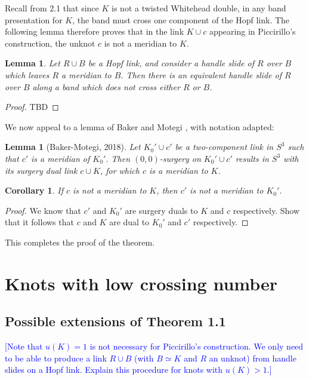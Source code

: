 \documentclass[11pt,usenames,dvipsnames,reqno]{amsart}
\numberwithin{theorem}{section}
\newtheorem{corollary}[theorem]{Corollary}
\newtheorem{lemma}[theorem]{Lemma}
\theoremstyle{ex}
\theoremstyle{rem}
\def\kh#1{\textcolor{Blue}{#1}}
\begin{document}
Recall from 2.1 that since $K$ is not a twisted Whitehead double, in any band presentation for $K$, the band must cross one component of the Hopf link. The following lemma therefore proves that in the link $K\cup c$ appearing in Piccirillo's construction, the unknot $c$ is not a meridian to $K$.

\begin{lemma}
	Let $R\cup B$ be a Hopf link, and consider a handle slide of $R$ over $B$ which leaves $R$ a meridian to $B$. Then there is an equivalent handle slide of $R$ over $B$ along a band which does not cross either $R$ or $B$.
\end{lemma}
\begin{proof}
	TBD
\end{proof}

We now appeal to a lemma of Baker and Motegi \cite[Lemma 2.4]{baker-motegi}, with notation adapted:

\begin{lemma}[Baker-Motegi, 2018]
	Let $K_0'\cup c'$ be a two-component link in $S^3$ such that $c'$ is a meridian of $K_0'$. Then $(0,0)$-surgery on $K_0'\cup c'$ results in $S^3$ with its surgery dual link $c\cup K$, for which $c$ is a meridian to $K$.
\end{lemma}

\begin{corollary}
	If $c$ is not a meridian to $K$, then $c'$ is not a meridian to $K_0'$.
\end{corollary}

\begin{proof}
	We know that $c'$ and $K_0'$ are surgery duals to $K$ and $c$ respectively. Show that it follows that $c$ and $K$ are dual to $K_0'$ and $c'$ respectively.
\end{proof}
This completes the proof of the theorem.

\section{Knots with low crossing number}

\subsection{Possible extensions of Theorem 1.1} \kh{[Note that $u(K)=1$ is not necessary for Piccirillo's construction. We only need to be able to produce a link $R\cup B$ (with $B\simeq K$ and $R$ an unknot) from handle slides on a Hopf link. Explain this procedure for knots with $u(K)>1$.]}
\end{document}
